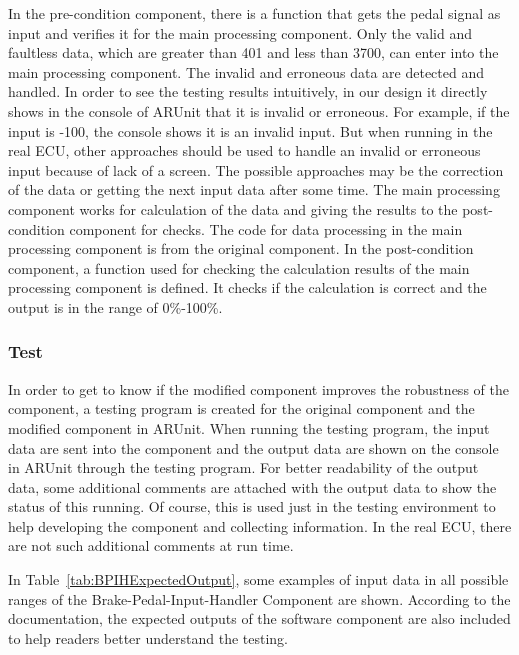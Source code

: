 In the pre-condition component, there is a function that gets the pedal signal as input and verifies it for the main processing component. Only the valid and faultless data, which are greater than 401 and less than 3700, can enter into the main processing component. The invalid and erroneous data are detected and handled. 
In order to see the testing results intuitively, in our design it directly shows in the console of ARUnit that it is invalid or erroneous. For example, if the input is -100, the console shows it is an invalid input.  But when running in the real ECU, other approaches should be used to handle an invalid or erroneous input because of lack of a screen. The possible approaches may be the correction of the data or getting the next input data after some time. The main processing component works for calculation of the data and giving the results to the post-condition component for checks. The code for data processing in the main processing component is from the original component. In the post-condition component, a function used for checking the calculation results of the main processing component is defined. It checks if the calculation is correct and the output is in the range of 0\%-100\%. 

\subsubsection{Test}
In order to get to know if the modified component improves the robustness of the component, a testing program is created for the original component and the modified component in ARUnit. When running the testing program, the input data are sent into the component and the output data are shown on the console in ARUnit through the testing program. For better readability of the output data, some additional comments are attached with the output data to show the status of this running. Of course, this is used just in the testing environment to help developing the component and collecting information. In the real ECU, there are not such additional comments at run time. 

In Table~\ref{tab:BPIHExpectedOutput}, some examples of input data in all possible ranges of the Brake-Pedal-Input-Handler Component are shown. According to the documentation, %
the expected outputs of the software component are also included to help readers better understand the testing. 

